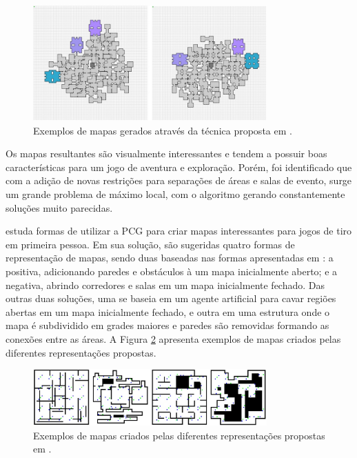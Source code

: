 \begin{figure}[htb]
	\begin{center}
		\includegraphics[width=0.8\textwidth]{Imagens/valtchanov2012evolving.jpg}
		\caption{Exemplos de mapas gerados através da técnica proposta em \cite{valtchanov2012evolving}.}
		\label{fig:valtchanov2012evolving}
	\end{center}
\end{figure}

Os mapas resultantes são visualmente interessantes e tendem a possuir boas características para um jogo de aventura e exploração. Porém, foi identificado que com a adição de novas restrições para separações de áreas e salas de evento, surge um grande problema de máximo local, com o algoritmo gerando constantemente soluções muito parecidas.

\cite{cardamone2011evolving} estuda formas de utilizar a PCG para criar mapas interessantes para jogos de tiro em primeira pessoa. Em sua solução, são sugeridas quatro formas de representação de mapas, sendo duas baseadas nas formas apresentadas em \cite{ashlock2011search}: a positiva, adicionando paredes e obstáculos à um mapa inicialmente aberto; e a negativa, abrindo corredores e salas em um mapa inicialmente fechado. Das outras duas soluções, uma se baseia em um agente artificial para cavar regiões abertas em um mapa inicialmente fechado, e outra em uma estrutura onde o mapa é subdividido em grades maiores e paredes são removidas formando as conexões entre as áreas. A Figura \ref{fig:cardamone2011evolving} apresenta exemplos de mapas criados pelas diferentes representações propostas.

\begin{figure}[htb]
	\begin{center}
		\includegraphics[width=0.8\textwidth]{Imagens/cardamone2011evolving.jpg}
		\caption{Exemplos de mapas criados pelas diferentes representações propostas em \cite{cardamone2011evolving}.}
		\label{fig:cardamone2011evolving}
	\end{center}
\end{figure}

